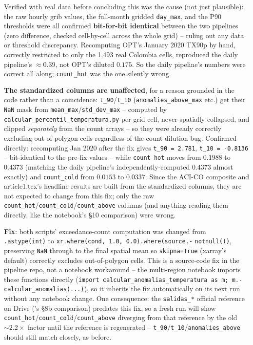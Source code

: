 \documentclass[11pt]{article}
\begin{document}
Verified with real data before concluding this was the cause (not just
plausible): the raw hourly grib values, the full-month gridded
\texttt{day\_max}, and the P90 thresholds were all confirmed
\textbf{bit-for-bit identical} between the two pipelines (zero difference,
checked cell-by-cell across the whole grid) -- ruling out any data or
threshold discrepancy. Recomputing OPT's January 2020 TX90p by hand,
correctly restricted to only the 1{,}493 real Colombia cells, reproduced
the daily pipeline's $\approx 0.39$, not OPT's diluted $0.175$. So the
daily pipeline's numbers were correct all along; \texttt{count\_hot} was
the one silently wrong.

\textbf{The standardized columns are unaffected}, for a reason grounded in
the code rather than a coincidence: \texttt{t\_90}/\texttt{t\_10}
(\texttt{anomalies\_above\_max} etc.) get their \texttt{NaN} mask from
\texttt{mean\_max}/\texttt{std\_dev\_max} -- computed by
\texttt{calcular\_percentil\_temperatura.py} per grid cell, never spatially
collapsed, and clipped \emph{separately} from the count arrays -- so they
were already correctly excluding out-of-polygon cells regardless of the
count-dilution bug. Confirmed directly: recomputing Jan 2020 after the fix
gives \texttt{t\_90 = 2.781}, \texttt{t\_10 = -0.8136} -- bit-identical to
the pre-fix values -- while \texttt{count\_hot} moves from $0.1988$ to
$0.4373$ (matching the daily pipeline's independently-computed $0.4373$
almost exactly) and \texttt{count\_cold} from $0.0153$ to $0.0337$. Since
the ACI-CO composite and article1.tex's headline results are built from the
standardized columns, they are not expected to change from this fix; only
the raw \texttt{count\_hot}/\texttt{count\_cold}/\texttt{count\_above}
columns (and anything reading them directly, like the notebook's \S10
comparison) were wrong.

\textbf{Fix}: both scripts' exceedance-count computation was changed from
\texttt{.astype(int)} to \texttt{xr.where(cond, 1.0, 0.0).where(source.-}
\texttt{notnull())}, preserving \texttt{NaN} through to the final spatial
mean so \texttt{skipna=True} (xarray's default) correctly excludes
out-of-polygon cells. This is a source-code fix in the pipeline repo, not a
notebook workaround -- the multi-region notebook imports these functions
directly (\texttt{import calcular\_anomalias\_temperatura as m; m.-}
\texttt{calcular\_anomalias(...)}), so it inherits the fix automatically on
its next run without any notebook change. One consequence: the
\texttt{salidas\_*} official reference on Drive ('s
\S8b comparison) predates this fix, so a fresh run will show
\texttt{count\_hot}/\texttt{count\_cold}/\texttt{count\_above} diverging
from that reference by the old $\sim2.2\times$ factor until the reference
is regenerated -- \texttt{t\_90}/\texttt{t\_10}/\texttt{anomalies\_above}
should still match closely, as before.
\end{document}
